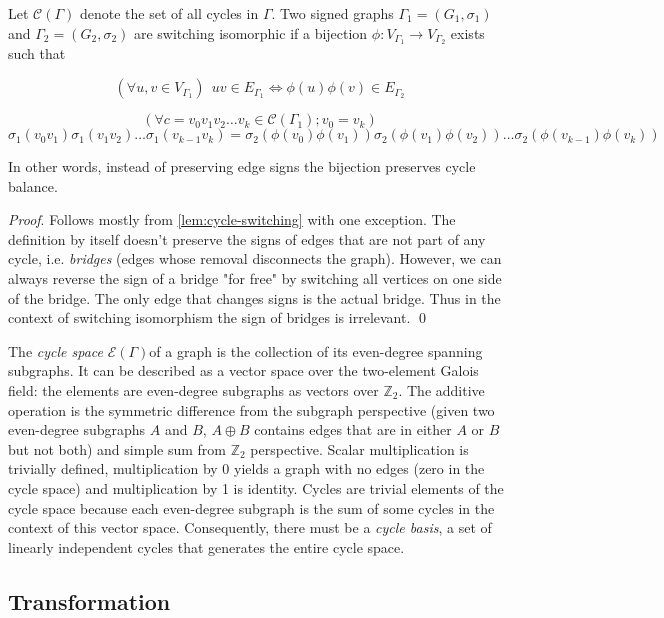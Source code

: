 \begin{theorem}\label{th:cycle-isomorphic}
    Let $\mathcal{C} (\Gamma)$ denote the set of all cycles in $\Gamma$. Two signed graphs $\Gamma _1 = (G_1, \sigma _1)$ and $\Gamma _2 = (G_2, \sigma _2)$ are switching isomorphic if a bijection $\phi : V _{\Gamma _1} \rightarrow V _{\Gamma _2}$ exists such that

    $$(\forall u,v \in V _{\Gamma _1}) ~~ uv \in E _{\Gamma _1} \iff \phi(u)\phi(v) \in E _{\Gamma _2}$$

    $$(\forall c = v_0v_1v_2 \dots v_k \in \mathcal{C} (\Gamma _1); v_0 = v_k)$$
    $$\sigma _1 (v_0v_1)\sigma _1 (v_1v_2) \dots \sigma _1 (v_{k-1}v_k) = \sigma _2 (\phi(v_0)\phi(v_1))\sigma _2 (\phi(v_1)\phi(v_2)) \dots \sigma _2 (\phi(v_{k-1})\phi(v_k))$$

    In other words, instead of preserving edge signs the bijection preserves cycle balance.
\end{theorem}

\textit{Proof}. Follows mostly from \cref{lem:cycle-switching} with one exception. The definition by itself doesn't preserve the signs of edges that are not part of any cycle, i.e. \textit{bridges} (edges whose removal disconnects the graph). However, we can always reverse the sign of a bridge "for free" by switching all vertices on one side of the bridge. The only edge that changes signs is the actual bridge. Thus in the context of switching isomorphism the sign of bridges is irrelevant. \qed

The \textit{cycle space} $\mathcal{E} (\Gamma)$of a graph is the collection of its even-degree spanning subgraphs. It can be described as a vector space over the two-element Galois field: the elements are even-degree subgraphs as vectors over $\mathbb{Z} _2$. The additive operation is the symmetric difference from the subgraph perspective (given two even-degree subgraphs $A$ and $B$, $A \oplus B$ contains edges that are in either $A$ or $B$ but not both) and simple sum from $\mathbb{Z} _2$ perspective. Scalar multiplication is trivially defined, multiplication by 0 yields a graph with no edges (zero in the cycle space) and multiplication by 1 is identity. Cycles are trivial elements of the cycle space because each even-degree subgraph is the sum of some cycles in the context of this vector space. Consequently, there must be a \textit{cycle basis}, a set of linearly independent cycles that generates the entire cycle space.

\subsection{Transformation}

